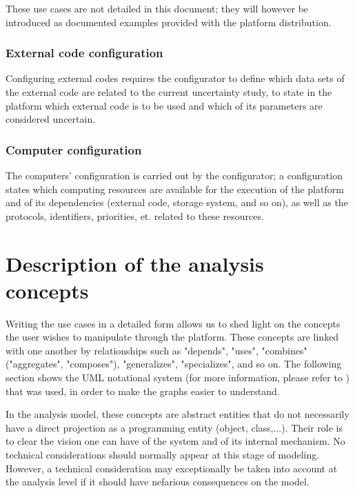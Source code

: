These use cases are not detailed in this document; they will however be introduced as documented examples provided with the platform distribution.

\subsubsection{External code configuration}

Configuring external codes requires the configurator to define which data sets of the external code are related to the current uncertainty study, to state in the platform which external code is to be used and which of its parameters are considered uncertain.

\subsubsection{Computer configuration}

The computers' configuration is carried out by the configurator; a configuration states which computing resources are available for the execution of the platform and of its dependencies (external code, storage system, and so on), as well as the protocols, identifiers, priorities, et. related to these resources.

\section{Description of the analysis concepts}

Writing the use cases in a detailed form allows us to shed light on the concepts the user wishes to manipulate through the platform. These concepts are linked with one another by relationships such as "depends", "uses", "combines" ("aggregates", "composes"), "generalizes", "specializes", and so on. The following section shows the UML notational system (for more information, please refer to \cite{UML}) that was used, in order to make the graphs easier to understand.

In the analysis model, these concepts are abstract entities that do not necessarily have a direct projection as a programming entity (object, class,...). Their role is to clear the vision one can have of the system and of its internal mechanism. No technical considerations should normally appear at this stage of modeling. However, a technical consideration may exceptionally be taken into account at the analysis level if it should have nefarious consequences on the model.

